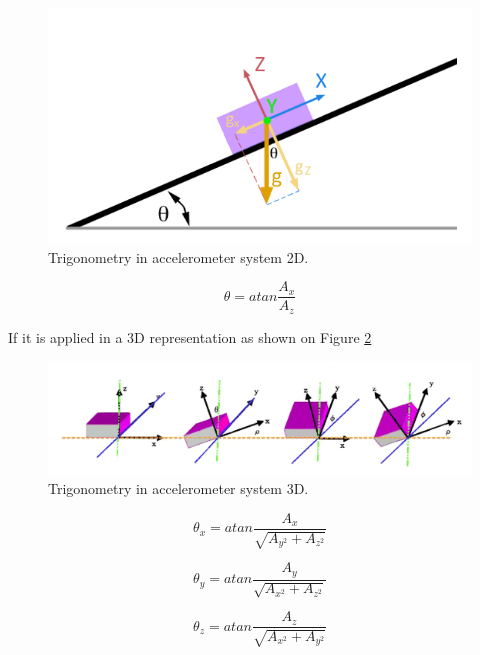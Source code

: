\begin{figure}[H]
	\center
	\includegraphics[scale=0.4]{imagenes/Balancing_robot/acelerometro1}
	\caption{Trigonometry in accelerometer system 2D.}
	\label{fig:acelerometro1}
\end{figure}

\begin{equation}
\theta = atan\frac{A_{x}}{A_{z}}
\end{equation}

If it is applied in a 3D representation as shown on Figure \ref{fig:acelerometro2}

\begin{figure}[H]
	\center
	\includegraphics[scale=0.6]{imagenes/Balancing_robot/acelerometro2}
	\caption{Trigonometry in accelerometer system 3D.}
	\label{fig:acelerometro2}
\end{figure}

\begin{equation}
\theta_{x} = atan\frac{A_{x}}{\sqrt{A_{y^2}+A_{z^2}}}
\end{equation}

\begin{equation}
\theta_{y} = atan\frac{A_{y}}{\sqrt{A_{x^2}+A_{z^2}}}
\end{equation}

\begin{equation}
\theta_{z} = atan\frac{A_{z}}{\sqrt{A_{x^2}+A_{y^2}}}
\end{equation}
\newpage
